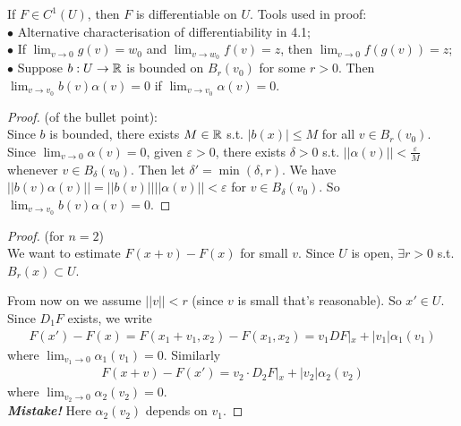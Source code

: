 \documentclass[a4paper]{article}
\begin{document}
\begin{thm}
If $F \in C^1(U)$, then $F$ is differentiable on $U$.
Tools used in proof:\\
$\bullet$ Alternative characterisation of differentiability in 4.1;\\
$\bullet$ If $\lim_{v\to 0} g(v) = w_0$ and $\lim_{v\to w_0} f(v)=z$, then $\lim_{v \to 0}f(g(v)) = z$;\\
$\bullet$ Suppose $b: U \to \mathbb{R}$ is bounded on $B_r(v_0)$ for some $r>0$. Then $\lim_{v \to v_0} b(v)\alpha(v)=0$ if $\lim_{v\to v_0} \alpha(v) = 0$.
\begin{proof} (of the bullet point):\\
Since $b$ is bounded, there exists $M \in \mathbb{R}$ s.t. $|b(x)| \leq M$ for all $v \in B_r(v_0)$. Since $\lim_{v \to 0} \alpha(v)=0$, given $\varepsilon>0$, there exists $\delta > 0$ s.t. $||\alpha(v)||<\frac{\varepsilon}{M}$ whenever $v \in B_\delta(v_0)$. Then let $\delta' = \min(\delta,r)$. We have $||b(v)\alpha(v)|| = ||b(v)||||\alpha(v)||<\varepsilon$ for $v \in B_\delta(v_0)$. So $\lim_{v \to v_0} b(v)\alpha(v) = 0$.
\end{proof}
\begin{proof} (for $n=2$)\\
We want to estimate $F(x+v)-F(x)$ for small $v$. Since $U$ is open, $\exists r>0$ s.t. $B_r(x) \subset U$.

From now on we assume $||v||<r$ (since $v$ is small that's reasonable). So $x' \in U$. Since $D_1 F$ exists, we write
\begin{equation*}
\begin{aligned}
F(x')-F(x) = F(x_1+v_1,x_2)-F(x_1,x_2) = v_1DF|_x + |v_1|\alpha_1(v_1)
\end{aligned}
\end{equation*}
where $\lim_{v_1 \to 0} \alpha_1(v_1) = 0$.
Similarly
\begin{equation*}
\begin{aligned}
F(x+v)-F(x')=v_2 \cdot D_2 F|_x + |v_2| \alpha_2(v_2)
\end{aligned}
\end{equation*}
where $\lim_{v_2 \to 0} \alpha_2(v_2) = 0$.\\
\textit{\textbf{Mistake!}} Here $\alpha_2(v_2)$ depends on $v_1$.


\end{proof}
\end{thm}
\end{document}
